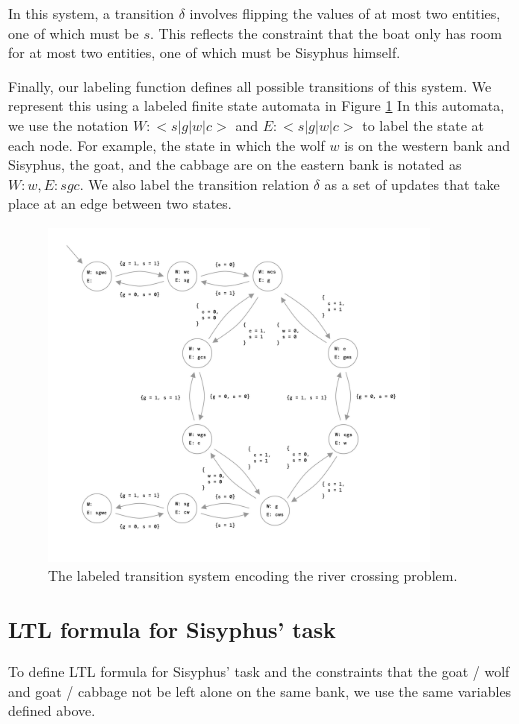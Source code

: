 \documentclass{article}
\begin{document}
In this system, a transition $\delta$ involves flipping the values of at most two entities, one of which must be $s$. This reflects the constraint that the boat only has room for at most two entities, one of which must be Sisyphus himself.

Finally, our labeling function defines all possible transitions of this system. We represent this using a labeled finite state automata in Figure \ref{fig:ltl-automata} In this automata, we use the notation $W:<s | g | w | c>$ and $E:<s | g | w | c>$ to label the state at each node. For example, the state in which the wolf $w$ is on the western bank and Sisyphus, the goat, and the cabbage are on the eastern bank is notated as $W: w, E: sgc$. We also label the transition relation $\delta$ as a set of updates that take place at an edge between two states.

\begin{figure}
  \centering
  \includegraphics[width=0.9\textwidth]{ltl-automata}
  \caption{The labeled transition system encoding the river crossing problem.}
  \label{fig:ltl-automata}
\end{figure}

\subsection{LTL formula for Sisyphus' task}

To define LTL formula for Sisyphus' task and the constraints that the goat / wolf and goat / cabbage not be left alone on the same bank, we use the same variables defined above.
\end{document}
